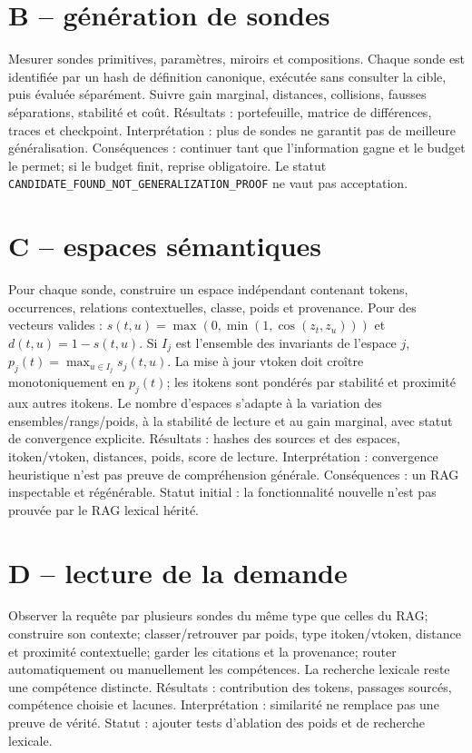 \documentclass[11pt,a4paper]{report}
\begin{document}
\section{B -- génération de sondes}Mesurer sondes primitives, paramètres, miroirs et compositions. Chaque sonde est identifiée par un hash de définition canonique, exécutée sans consulter la cible, puis évaluée séparément. Suivre gain marginal, distances, collisions, fausses séparations, stabilité et coût. Résultats : portefeuille, matrice de différences, traces et checkpoint. Interprétation : plus de sondes ne garantit pas de meilleure généralisation. Conséquences : continuer tant que l'information gagne et le budget le permet; si le budget finit, reprise obligatoire. Le statut \texttt{CANDIDATE\_FOUND\_NOT\_GENERALIZATION\_PROOF} ne vaut pas acceptation.
\section{C -- espaces sémantiques}Pour chaque sonde, construire un espace indépendant contenant tokens, occurrences, relations contextuelles, classe, poids et provenance. Pour des vecteurs valides : $s(t,u)=\max(0,\min(1,\cos(z_t,z_u)))$ et $d(t,u)=1-s(t,u)$. Si $I_j$ est l'ensemble des invariants de l'espace $j$, $p_j(t)=\max_{u\in I_j}s_j(t,u)$. La mise à jour vtoken doit croître monotoniquement en $p_j(t)$; les itokens sont pondérés par stabilité et proximité aux autres itokens. Le nombre d'espaces s'adapte à la variation des ensembles/rangs/poids, à la stabilité de lecture et au gain marginal, avec statut de convergence explicite. Résultats : hashes des sources et des espaces, itoken/vtoken, distances, poids, score de lecture. Interprétation : convergence heuristique n'est pas preuve de compréhension générale. Conséquences : un RAG inspectable et régénérable. Statut initial : la fonctionnalité nouvelle n'est pas prouvée par le RAG lexical hérité.
\section{D -- lecture de la demande}Observer la requête par plusieurs sondes du même type que celles du RAG; construire son contexte; classer/retrouver par poids, type itoken/vtoken, distance et proximité contextuelle; garder les citations et la provenance; router automatiquement ou manuellement les compétences. La recherche lexicale reste une compétence distincte. Résultats : contribution des tokens, passages sourcés, compétence choisie et lacunes. Interprétation : similarité ne remplace pas une preuve de vérité. Statut : ajouter tests d'ablation des poids et de recherche lexicale.
\end{document}
